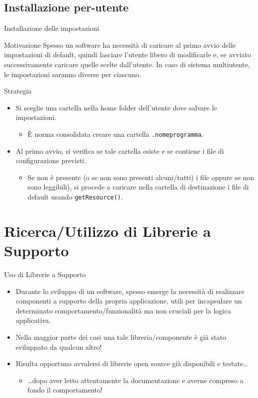 \documentclass[presentation]{beamer}
\begin{document}
\subsection{Installazione per-utente}

\begin{frame}{Installazione delle impostazioni}
\begin{block}{Motivazione}
Spesso un software ha necessità di caricare al primo avvio delle impostazioni di default, quindi lasciare l'utente libero di modificarle e, se avviato successivamente caricare quelle scelte dall'utente. In caso di sistema multiutente, le impostazioni saranno diverse per ciascuno.
\end{block}

\begin{block}{Strategia}
\begin{itemize}
\item Si sceglie una cartella nella home folder dell'utente dove salvare le impostazioni. 
\begin{itemize}
\item È norma consolidata creare una cartella \texttt{.nomeprogramma}.
\end{itemize}

\item Al primo avvio, si verifica se tale cartella esiste e se contiene i file di configurazione previsti.
\begin{itemize}
\item Se non è presente (o se non sono presenti alcuni/tutti) i file oppure se non sono leggibili), si procede a caricare nella cartella di destinazione i file di default usando \texttt{getResource()}.
\end{itemize}
\end{itemize}
\end{block}
\end{frame}

\section{Ricerca/Utilizzo di Librerie a Supporto}
\begin{frame}{Uso di Librerie a Supporto}
\begin{itemize}\itemsep15pt
\item Durante lo sviluppo di un software, spesso emerge la necessità di realizzare componenti a supporto della propria applicazione, utili per incapsulare un determinato comportamento/funzionalità ma non cruciali per la logica applicativa.

\item Nella maggior parte dei casi una tale libreria/componente è già stato sviluppato da qualcun altro!

\item Risulta opportuno avvalersi di librerie open source già disponibili e testate\dots
\begin{itemize}
\item \dots dopo aver letto attentamente la documentazione e averne compreso a fondo il comportamento!
\end{itemize}
\end{itemize}
\end{frame}
\end{document}
